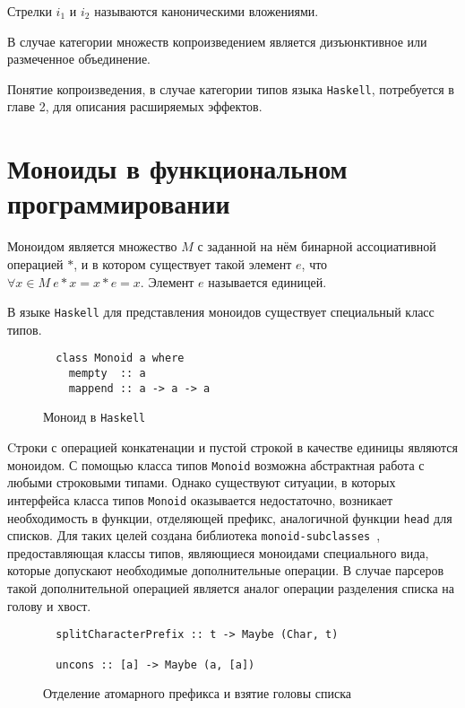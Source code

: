   \begin{center}
  \end{center}

  Стрелки $i_1$ и $i_2$ называются каноническими вложениями.

  В случае категории множеств копроизведением является дизъюнктивное
  или размеченное объединение.

  Понятие копроизведения, в случае категории типов языка \lstinline{Haskell},
  потребуется в главе 2, для описания расширяемых эффектов.

\section{Моноиды в функциональном программировании}

  Моноидом является множество $M$ с заданной на нём бинарной ассоциативной
  операцией $*$, и в котором существует такой элемент
  $e$, что $\forall x \in M~e*x = x*e = x$. Элемент $e$ называется единицей.

  В языке \lstinline{Haskell} для представления моноидов существует специальный
  класс типов.

  \begin{figure}[h]
  \begin{lstlisting}
  class Monoid a where
    mempty  :: a
    mappend :: a -> a -> a
  \end{lstlisting}
  \caption{Моноид в \lstinline{Haskell}}
  \label{listing:Monoid}
  \end{figure}

  Cтроки с операцией конкатенации и пустой строкой в качестве единицы являются
  моноидом. С помощью класса типов \lstinline{Monoid} возможна абстрактная работа
  с любыми строковыми типами. Однако существуют ситуации, в которых интерфейса
  класса типов \lstinline{Monoid} оказывается недостаточно, возникает
  необходимость в функции, отделяющей префикс, аналогичной функции
  \lstinline{head} для списков. Для таких целей создана библиотека
  \lstinline{monoid-subclasses}~\cite{monoids}, предоставляющая
  классы типов, являющиеся моноидами специального вида, которые допускают
  необходимые дополнительные операции. В случае парсеров такой дополнительной
  операцией является аналог операции разделения списка на голову и хвост.

  \begin{figure}[h]
  \begin{lstlisting}
  splitCharacterPrefix :: t -> Maybe (Char, t)

  uncons :: [a] -> Maybe (a, [a])
  \end{lstlisting}
  \caption{Отделение атомарного префикса и взятие головы списка}
  \label{listing:Monoid}
  \end{figure}